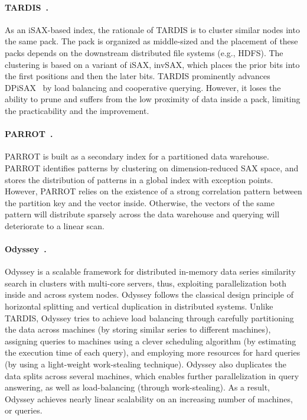 \documentclass[11pt]{article}
\begin{document}
\paragraph{TARDIS~\cite{tardis}.}
As an iSAX-based index, the rationale of TARDIS is to cluster similar nodes into the same pack.
The pack is organized as middle-sized and the placement of these packs depends on the downstream distributed file systems (e.g., HDFS).
The clustering is based on a variant of iSAX, invSAX, which places the prior bits into the first positions and then the later bits.
TARDIS prominently advances DPiSAX~\cite{dpisax} by load balancing and cooperative querying.
However, it loses the ability to prune and suffers from the low proximity of data inside a pack, limiting the practicability and the improvement.

\paragraph{PARROT~\cite{parrot}.}
PARROT is built as a secondary index for a partitioned data warehouse.
PARROT identifies patterns by clustering on dimension-reduced SAX space, and stores the distribution of patterns in a global index with exception points.
However, PARROT relies on the existence of a strong correlation pattern between the partition key and the vector inside.
Otherwise, the vectors of the same pattern will distribute sparsely across the data warehouse and querying will deteriorate to a linear scan.

\paragraph{Odyssey~\cite{odyssey}.}
Odyssey is a scalable framework for distributed in-memory data series similarity search in clusters with multi-core servers, thus, exploiting parallelization both inside and across system nodes.
Odyssey follows the classical design principle of horizontal splitting and vertical duplication in distributed systems.
Unlike TARDIS, Odyssey tries to achieve load balancing through carefully partitioning the data across machines (by storing similar series to different machines), assigning queries to machines using a clever scheduling algorithm (by estimating the execution time of each query), and employing more resources for hard queries (by using a light-weight work-stealing technique).
Odyssey also duplicates the data splits across several machines, which enables further parallelization in query answering, as well as load-balancing (through work-stealing).
As a result, Odyssey achieves nearly linear scalability on an increasing number of machines, or queries.
\end{document}
